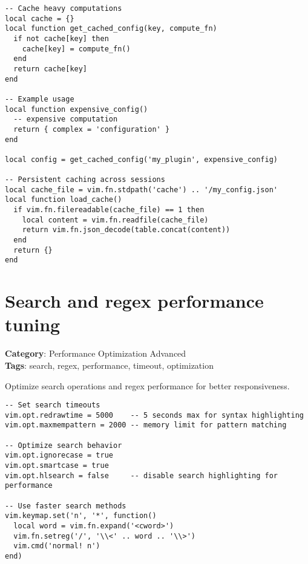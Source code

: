 {{{{{{{{{{\begin{Exa*}{}
\begin{Verbatim}[fontsize=\footnotesize, breaklines, breakanywhere]
-- Cache heavy computations
local cache = {}
local function get_cached_config(key, compute_fn)
  if not cache[key] then
    cache[key] = compute_fn()
  end
  return cache[key]
end

-- Example usage
local function expensive_config()
  -- expensive computation
  return { complex = 'configuration' }
end

local config = get_cached_config('my_plugin', expensive_config)

-- Persistent caching across sessions
local cache_file = vim.fn.stdpath('cache') .. '/my_config.json'
local function load_cache()
  if vim.fn.filereadable(cache_file) == 1 then
    local content = vim.fn.readfile(cache_file)
    return vim.fn.json_decode(table.concat(content))
  end
  return {}
end
\end{Verbatim}
\end{Exa*}

\section{Search and regex performance tuning}

\textbf{Category}: Performance Optimization Advanced\\ \textbf{Tags}: search, regex, performance, timeout, optimization
\vspace{0.5cm}

Optimize search operations and regex performance for better responsiveness.

\begin{Exa*}{}
\begin{Verbatim}[fontsize=\footnotesize, breaklines, breakanywhere]
-- Set search timeouts
vim.opt.redrawtime = 5000    -- 5 seconds max for syntax highlighting
vim.opt.maxmempattern = 2000 -- memory limit for pattern matching

-- Optimize search behavior
vim.opt.ignorecase = true
vim.opt.smartcase = true
vim.opt.hlsearch = false     -- disable search highlighting for performance

-- Use faster search methods
vim.keymap.set('n', '*', function()
  local word = vim.fn.expand('<cword>')
  vim.fn.setreg('/', '\\<' .. word .. '\\>')
  vim.cmd('normal! n')
end)
\end{Verbatim}
\end{Exa*}

}}}}}}}}}}
